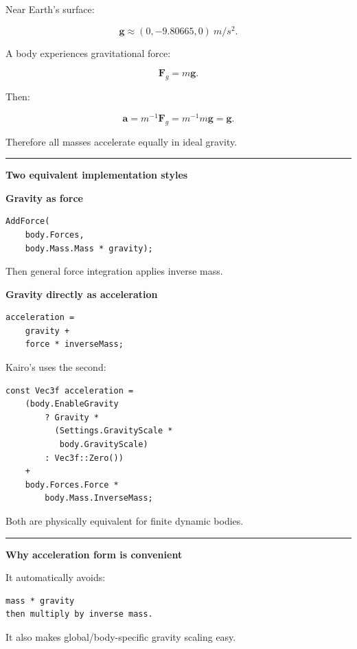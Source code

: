 Near Earth's surface:

\[
\mathbf{g}
\approx
(0,-9.80665,0)
\ m/s^2.
\]

A body experiences gravitational force:

\[
\boxed{
\mathbf{F}_g
=
m\mathbf{g}.
}
\]

Then:

\[
\mathbf{a}
=
m^{-1}\mathbf{F}_g
=
m^{-1}m\mathbf{g}
=
\mathbf{g}.
\]

Therefore all masses accelerate equally in ideal gravity.

\begin{center}\rule{0.5\linewidth}{0.5pt}\end{center}

\textbf{Two equivalent implementation styles}

\textbf{Gravity as force}

\begin{verbatim}
AddForce(
    body.Forces,
    body.Mass.Mass * gravity);
\end{verbatim}

Then general force integration applies inverse mass.

\textbf{Gravity directly as acceleration}

\begin{verbatim}
acceleration =
    gravity +
    force * inverseMass;
\end{verbatim}

Kairo's  uses the second:

\begin{verbatim}
const Vec3f acceleration =
    (body.EnableGravity
        ? Gravity *
          (Settings.GravityScale *
           body.GravityScale)
        : Vec3f::Zero())
    +
    body.Forces.Force *
        body.Mass.InverseMass;
\end{verbatim}

Both are physically equivalent for finite dynamic bodies.

\begin{center}\rule{0.5\linewidth}{0.5pt}\end{center}

\textbf{Why acceleration form is convenient}

It automatically avoids:

\begin{verbatim}
mass * gravity
then multiply by inverse mass.
\end{verbatim}

It also makes global/body-specific gravity scaling easy.

